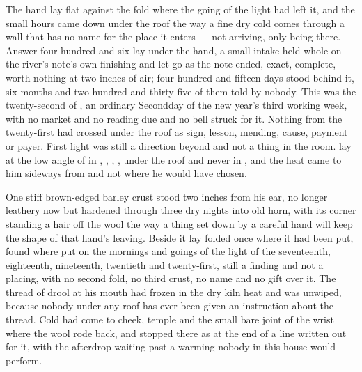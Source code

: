 
The hand lay flat against the fold where the going of the light had left it, and the small hours came down under the roof the way a fine dry cold comes through a wall that has no name for the place it enters --- not arriving, only being there. Answer four hundred and six lay under the hand, a small intake held whole on the river's note's own finishing and let go as the note ended, exact, complete, worth nothing at two inches of air; four hundred and fifteen days stood behind it, six months and two hundred and thirty-five of them told by nobody. This was the twenty-second of , an ordinary Secondday of the new year's third working week, with no market and no reading due and no bell struck for it. Nothing from the twenty-first had crossed under the roof as sign, lesson, mending, cause, payment or payer. First light was still a direction beyond  and not a thing in the room.  lay at the low angle of  in , , , , under the roof and never in , and the heat came to him sideways from  and not where he would have chosen.

One stiff brown-edged barley crust stood two inches from his ear, no longer leathery now but hardened through three dry nights into old horn, with its corner standing a hair off the wool the way a thing set down by a careful hand will keep the shape of that hand's leaving. Beside it  lay folded once where it had been put, found where put on the mornings and goings of the light of the seventeenth, eighteenth, nineteenth, twentieth and twenty-first, still a finding and not a placing, with no second fold, no third crust, no name and no gift over it. The thread of drool at his mouth had frozen in the dry kiln heat and was unwiped, because nobody under any roof has ever been given an instruction about the thread. Cold had come to cheek, temple and the small bare joint of the wrist where the wool rode back, and stopped there as at the end of a line written out for it, with the afterdrop waiting past a warming nobody in this house would perform.


